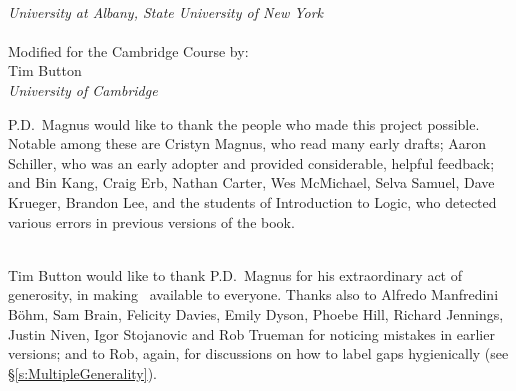 \thispagestyle{empty}

\vfill

\noindent\hfill {\HUGE\forallxcam}

\vfill


\\
\emph{University at Albany, State University of New York}\\
\\
Modified for the Cambridge Course by:\\Tim Button\\
\emph{University of Cambridge}




\newpage
\thispagestyle{empty}%
\noindent P.D.\ Magnus would like to thank the people who made this project possible. Notable among these are Cristyn Magnus, who read many early drafts; Aaron Schiller, who was an early adopter and provided considerable, helpful feedback; {and} Bin Kang, Craig Erb, Nathan Carter, Wes McMichael, Selva Samuel,  Dave Krueger, Brandon Lee, and the students of Introduction to Logic, who detected various errors in previous versions of the book.

\
\\
Tim Button would like to thank P.D.\ Magnus for his extraordinary act of generosity, in making \forallx\ available to everyone. Thanks also to Alfredo Manfredini B\"{o}hm, Sam Brain, Felicity Davies, Emily Dyson, Phoebe Hill, Richard Jennings, Justin Niven, Igor Stojanovic and Rob Trueman for noticing mistakes in earlier versions; and to Rob, again, for discussions on how to label gaps hygienically (see \S\ref{s:MultipleGenerality}).

